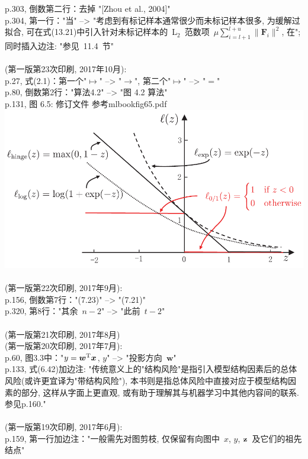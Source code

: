 \documentclass[UTF8]{article}
\begin{document}
p.303, 倒数第二行：去掉 "[Zhou et al., 2004]" \\
p.304, 第一行："当" --> "考虑到有标记样本通常很少而未标记样本很多, 为缓解过拟合, 可在式(13.21)中引入针对未标记样本的~L$_2$~范数项~$\mu \sum_{i=l+1}^{l+u}\|\mathbf{F}_{i}\|^{2}$, 在"; 同时插入边注: "参见~11.4~节" \\
\\
(第一版第23次印刷, 2017年10月):
\\
p.27, 式(2.1)：第一个"$\mapsto$" --> "$\to$", 第二个"$\mapsto$" --> "$=$" \\
p.80, 倒数第2行："算法4.2" --> "图 4.2 算法" \\
p.131, 图 6.5: 修订文件 参考mlbookfig65.pdf \\
\includegraphics{pic/mlbookfig65.pdf}\\
\\
(第一版第22次印刷, 2017年9月):
\\
p.156, 倒数第7行："(7.23)" --> "(7.21)" \\
p.320, 第8行："其余~$n-2$" --> "此前~$t-2$" \\
\\
(第一版第21次印刷, 2017年8月)
\\
(第一版第20次印刷, 2017年7月):
\\
p.60, 图3.3中："$y = \bm{w}^{\rm T}\bm{x}$, $y$" --> "投影方向~$\bm{w}$" \\
p.133, 式(6.42)加边注: "传统意义上的"结构风险"是指引入模型结构因素后的总体风险(或许更宜译为"带结构风险"), 本书则是指总体风险中直接对应于模型结构因素的部分, 这样从字面上更直观, 或有助于理解其与机器学习中其他内容间的联系. 参见p.160." \\
\\
(第一版第19次印刷, 2017年6月):
\\
p.159, 第一行加边注："一般需先对图剪枝, 仅保留有向图中~$x$, $y$, $\bf{z}$~及它们的祖先结点" \\
\end{document}
